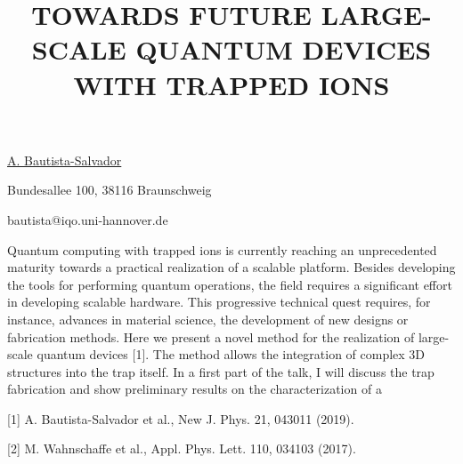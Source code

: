 \title{TOWARDS FUTURE LARGE-SCALE QUANTUM DEVICES WITH TRAPPED IONS}

\underline{A. Bautista-Salvador}  

{\normalsize{\vspace{-4mm}
Bundesallee 100, 38116 Braunschweig



\email bautista@iqo.uni-hannover.de}}

Quantum computing with trapped ions is currently reaching an unprecedented maturity towards a practical realization of a scalable platform. Besides developing the tools for performing quantum operations, the field requires a significant effort in developing scalable hardware. This progressive technical quest requires, for instance, advances in material science, the development of new designs or fabrication methods. Here we present a novel method for the realization of large-scale quantum devices [1]. The method allows the integration of complex 3D structures into the trap itself. In a first part of the talk, I will discuss the trap fabrication and show preliminary results on the characterization of a %

{\normalsize
[1] A. Bautista-Salvador et al., New J. Phys. 21, 043011 (2019).
\vsp

[2] M. Wahnschaffe et al., Appl. Phys. Lett. 110, 034103 (2017).
}

\vspace{\baselineskip}